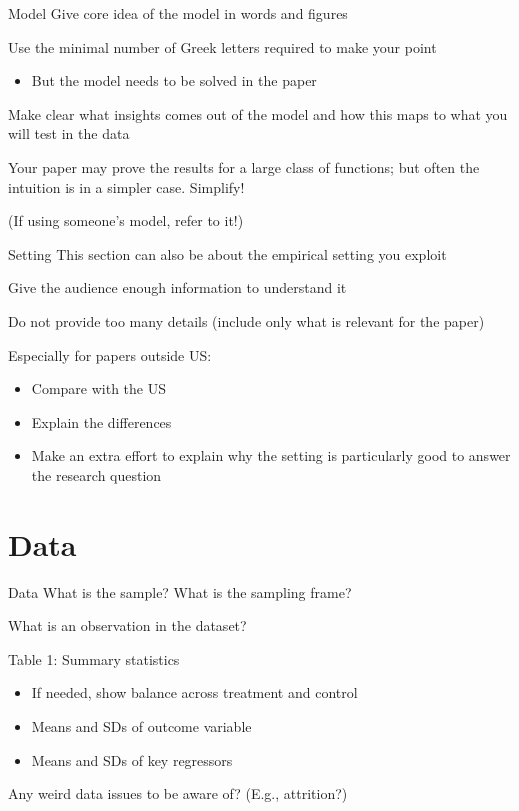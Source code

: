 \documentclass[aspectratio=169, 11pt]{beamer}
\begin{document}
\begin{frame}{Model}
    Give core idea of the model in words and figures
    
    Use the minimal number of Greek letters required to make your point\\
    \begin{itemize}
        \item But the model needs to be solved in the paper
    \end{itemize}
    
    Make clear what insights comes out of the model and how this maps to what you will test in the data
    
    Your paper may prove the results for a large class of functions; but often the intuition is in a simpler case. Simplify!
    
    \small (If using someone's model, refer to it!)
\end{frame}

\begin{frame}{Setting}
    This section can also be about the empirical setting you exploit
    
    Give the audience enough information to understand it
    
    Do not provide too many details (include only what is relevant for the paper)
    
    Especially for papers outside US:
    \begin{itemize}
        \item Compare with the US
        \item Explain the differences
        \item Make an extra effort to explain why the setting is particularly good to answer the research question
    \end{itemize}
\end{frame}

\section{Data}

\begin{frame}{Data}
    What is the sample? What is the sampling frame?
    
    What is an observation in the dataset?
    
    Table 1: Summary statistics\\
    \begin{itemize}
        \item If needed, show balance across treatment and control
        \item Means and SDs of outcome variable
        \item Means and SDs of key regressors
    \end{itemize}
    
    Any weird data issues to be aware of? (E.g., attrition?)
\end{frame}
\end{document}
